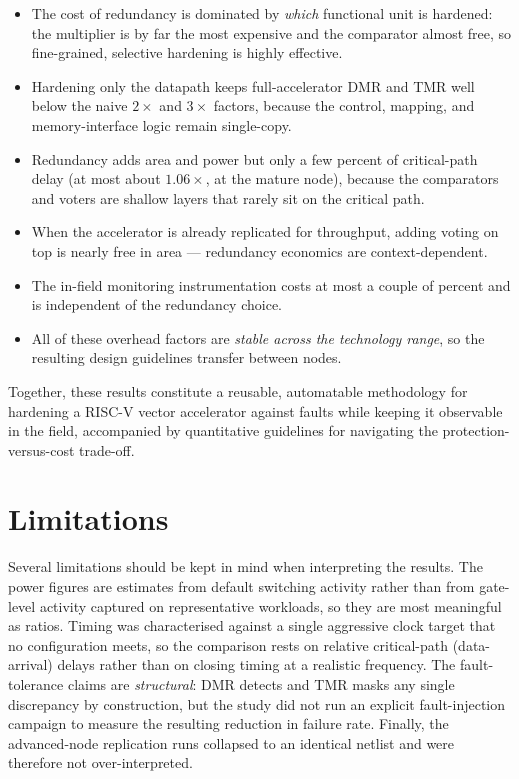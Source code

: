 \begin{itemize}
  \item The cost of redundancy is dominated by \emph{which} functional unit is
        hardened: the multiplier is by far the most expensive and the comparator
        almost free, so fine-grained, selective hardening is highly effective.
  \item Hardening only the datapath keeps full-accelerator DMR and TMR well below
        the naive $2\times$ and $3\times$ factors, because the control, mapping,
        and memory-interface logic remain single-copy.
  \item Redundancy adds area and power but only a few percent of critical-path
        delay (at most about $1.06\times$, at the mature node), because the
        comparators and voters are shallow layers that rarely sit on the
        critical path.
  \item When the accelerator is already replicated for throughput, adding voting
        on top is nearly free in area --- redundancy economics are
        context-dependent.
  \item The in-field monitoring instrumentation costs at most a couple of percent
        and is independent of the redundancy choice.
  \item All of these overhead factors are \emph{stable across the technology
        range}, so the resulting design guidelines transfer between nodes.
\end{itemize}

Together, these results constitute a reusable, automatable methodology for
hardening a RISC-V vector accelerator against faults while keeping it observable
in the field, accompanied by quantitative guidelines for navigating the
protection-versus-cost trade-off.

\section{Limitations}

Several limitations should be kept in mind when interpreting the results. The
power figures are estimates from default switching activity rather than from
gate-level activity captured on representative workloads, so they are most
meaningful as ratios. Timing was characterised against a single aggressive clock
target that no configuration meets, so the comparison rests on relative
critical-path (data-arrival) delays rather than on closing timing at a realistic
frequency. The fault-tolerance claims are \emph{structural}:
DMR detects and TMR masks any single discrepancy by construction, but the study
did not run an explicit fault-injection campaign to measure the resulting
reduction in failure rate. Finally, the advanced-node replication runs collapsed
to an identical netlist and were therefore not over-interpreted.

